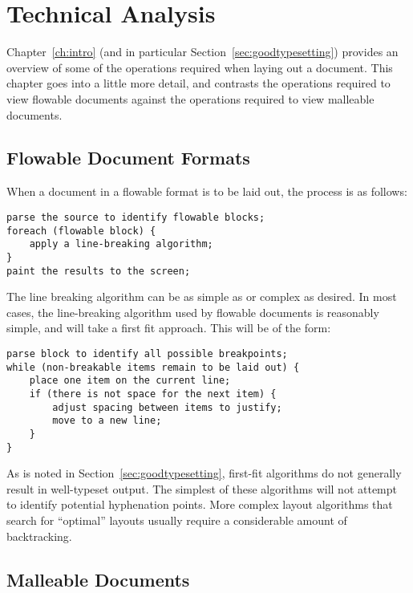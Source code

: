\chapter{Technical Analysis}\label{ch:techanalysis}



Chapter~\ref{ch:intro} (and in particular Section~\ref{sec:goodtypesetting}) provides an overview of some of the operations required when laying out a document. This chapter goes into a little more detail, and contrasts the operations required to view flowable documents against the operations required to view malleable documents.

\section{Flowable Document Formats}

When a document in a flowable format is to be laid out, the process is as follows:
{\singlespacing
\begin{lstlisting}
parse the source to identify flowable blocks;
foreach (flowable block) {
    apply a line-breaking algorithm;
}
paint the results to the screen;
\end{lstlisting}
}

The line breaking algorithm can be as simple as or complex as desired. In most cases, the line-breaking algorithm used by flowable documents is reasonably simple, and will take a first fit approach. This will be of the form:

{\singlespacing
\begin{lstlisting}
parse block to identify all possible breakpoints;
while (non-breakable items remain to be laid out) {
    place one item on the current line;
    if (there is not space for the next item) {
        adjust spacing between items to justify;
        move to a new line;
    }
}
\end{lstlisting}
}

As is noted in Section~\ref{sec:goodtypesetting}, first-fit algorithms do not generally result in well-typeset output. The simplest of these algorithms will not attempt to identify potential hyphenation points. More complex layout algorithms that search for ``optimal'' layouts usually require a considerable amount of backtracking.

\section{Malleable Documents}

